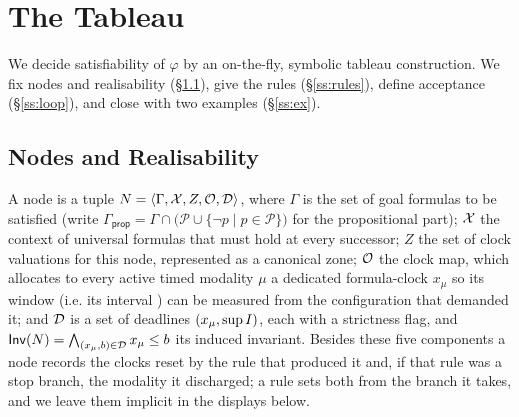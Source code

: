 
\section{The Tableau}\label{sec:tableau}
%
%
%
We decide satisfiability of $\varphi$ by an on-the-fly, symbolic tableau construction.
%
%
We fix nodes and realisability
(\S\ref{ss:nodes}), give the rules (\S\ref{ss:rules}), define acceptance (\S\ref{ss:loop}), and
close with two examples (\S\ref{ss:ex}).

\subsection{Nodes and Realisability}\label{ss:nodes}


A {node} is a tuple $N=\langle \Gamma, \mathcal{X}, Z, \mathcal{O}, \mathcal{D}\rangle$, where $\Gamma$ is the set of
goal formulas to be satisfied (write $\Gamma_{\mathsf{prop}}=\Gamma\cap\big(\mathcal P\cup\{\neg p\mid p\in\mathcal P\}\big)$ for the propositional part); $\mathcal{X}$ the {context} of universal formulas that must
hold at every successor; $Z$ the set of clock valuations for this node, represented as a canonical zone; $\mathcal{O}$ the {clock map}, which allocates to every active timed modality $\mu$ a dedicated formula-clock $x_\mu$ so its window (i.e. its interval \kI) can be measured from the configuration that demanded it; and $\mathcal{D}$ is a set of deadlines
$(x_\mu,\sup I)$, each with a strictness flag, and $\mathsf{Inv}(N)=\bigwedge_{(x_\mu,b)\in \mathcal{D}}x_\mu\le b$
its induced invariant. Besides these five components a node records the clocks reset by the rule
that produced it and, if that rule was a stop branch, the modality it discharged; a rule sets both
from the branch it takes, and we leave them implicit in the displays below.

